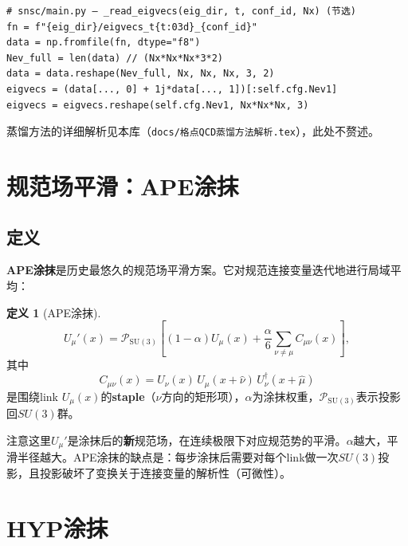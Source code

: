 \documentclass[12pt,a4paper]{ctexart}
\theoremstyle{definition}
\newtheorem{definition}{定义}[section]
\begin{document}
\begin{verbatim}
# snsc/main.py — _read_eigvecs(eig_dir, t, conf_id, Nx) (节选)
fn = f"{eig_dir}/eigvecs_t{t:03d}_{conf_id}"
data = np.fromfile(fn, dtype="f8")
Nev_full = len(data) // (Nx*Nx*Nx*3*2)
data = data.reshape(Nev_full, Nx, Nx, Nx, 3, 2)
eigvecs = (data[..., 0] + 1j*data[..., 1])[:self.cfg.Nev1]
eigvecs = eigvecs.reshape(self.cfg.Nev1, Nx*Nx*Nx, 3)
\end{verbatim}

蒸馏方法的详细解析见本库\cite{DistillationDoc}（\texttt{docs/格点QCD蒸馏方法解析.tex}），此处不赘述。

\section{规范场平滑：APE涂抹}

\subsection{定义}

\textbf{APE涂抹}是历史最悠久的规范场平滑方案\cite{APE1987}。它对规范连接变量迭代地进行局域平均：

\begin{definition}[APE涂抹]
\begin{equation}
U_\mu'(x) = \mathcal{P}_{\mathrm{SU}(3)}\!\left[ (1-\alpha) U_\mu(x) + \frac{\alpha}{6} \sum_{\nu \ne \mu} C_{\mu\nu}(x) \right],
\label{eq:ape}
\end{equation}
其中
\begin{equation}
C_{\mu\nu}(x) = U_\nu(x)\, U_\mu(x+\hat\nu)\, U^\dagger_\nu(x+\hat\mu)
\label{eq:staple}
\end{equation}
是围绕link $U_\mu(x)$的\textbf{staple}（$\nu$方向的矩形项），$\alpha$为涂抹权重，$\mathcal{P}_{\mathrm{SU}(3)}$表示投影回$SU(3)$群。
\end{definition}

注意这里$U_\mu'$是涂抹后的\textbf{新}规范场，在连续极限下对应规范势的平滑。$\alpha$越大，平滑半径越大。APE涂抹的缺点是：每步涂抹后需要对每个link做一次$SU(3)$投影，且投影破坏了变换关于连接变量的解析性（可微性）。

\section{HYP涂抹}
\end{document}
